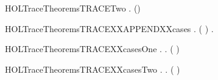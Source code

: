 \newcommand{\HOLTraceTheoremsTRACEOne}{\UseVerbatim{HOLTraceTheoremsTRACEOne}}
\begin{SaveVerbatim}{HOLTraceTheoremsTRACETwo}
\HOLTokenTurnstile{} \HOLSymConst{\HOLTokenForall{}}    .  \HOLTokenTransBegin{}\HOLTokenTransEnd {} \HOLSymConst{\HOLTokenConj{}}     \HOLSymConst{\HOLTokenImp{}}   (\HOLSymConst{::}) 
\end{SaveVerbatim}
\newcommand{\HOLTraceTheoremsTRACETwo}{\UseVerbatim{HOLTraceTheoremsTRACETwo}}
\begin{SaveVerbatim}{HOLTraceTheoremsTRACEXXAPPENDXXcases}
\HOLTokenTurnstile{} \HOLSymConst{\HOLTokenForall{}}   .
         ( \HOLSymConst{++} )  \HOLSymConst{\HOLTokenEquiv{}} \HOLSymConst{\HOLTokenExists{}}.     \HOLSymConst{\HOLTokenConj{}}    
\end{SaveVerbatim}
\newcommand{\HOLTraceTheoremsTRACEXXAPPENDXXcases}{\UseVerbatim{HOLTraceTheoremsTRACEXXAPPENDXXcases}}
\begin{SaveVerbatim}{HOLTraceTheoremsTRACEXXcasesOne}
\HOLTokenTurnstile{} \HOLSymConst{\HOLTokenForall{}}  .
           \HOLSymConst{\HOLTokenEquiv{}}      \HOLSymConst{=} 
        \HOLSymConst{\HOLTokenExists{}}.  \HOLTokenTransBegin{} \HOLTokenTransEnd {} \HOLSymConst{\HOLTokenConj{}}   ( ) 
\end{SaveVerbatim}
\newcommand{\HOLTraceTheoremsTRACEXXcasesOne}{\UseVerbatim{HOLTraceTheoremsTRACEXXcasesOne}}
\begin{SaveVerbatim}{HOLTraceTheoremsTRACEXXcasesTwo}
\HOLTokenTurnstile{} \HOLSymConst{\HOLTokenForall{}}  .
           \HOLSymConst{\HOLTokenEquiv{}}      \HOLSymConst{=} 
        \HOLSymConst{\HOLTokenExists{}}.   ( )  \HOLSymConst{\HOLTokenConj{}}  \HOLTokenTransBegin{} \HOLTokenTransEnd {}
\end{SaveVerbatim}
